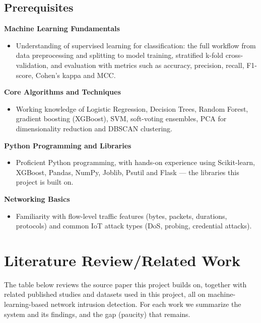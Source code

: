 \documentclass[12pt,a4paper]{article}
\begin{document}
\subsection{Prerequisites}
\textbf{Machine Learning Fundamentals}
\begin{itemize}
  \item Understanding of supervised learning for classification: the full workflow
        from data preprocessing and splitting to model training, stratified k-fold
        cross-validation, and evaluation with metrics such as accuracy, precision,
        recall, F1-score, Cohen's kappa and MCC.
\end{itemize}
\textbf{Core Algorithms and Techniques}
\begin{itemize}
  \item Working knowledge of Logistic Regression, Decision Trees, Random Forest,
        gradient boosting (XGBoost), SVM, soft-voting ensembles, PCA for
        dimensionality reduction and DBSCAN clustering.
\end{itemize}
\textbf{Python Programming and Libraries}
\begin{itemize}
  \item Proficient Python programming, with hands-on experience using Scikit-learn,
        XGBoost, Pandas, NumPy, Joblib, Psutil and Flask --- the libraries this
        project is built on.
\end{itemize}
\textbf{Networking Basics}
\begin{itemize}
  \item Familiarity with flow-level traffic features (bytes, packets, durations,
        protocols) and common IoT attack types (DoS, probing, credential attacks).
\end{itemize}

\clearpage
\section{Literature Review/Related Work}

The table below reviews the source paper this project builds on, together with
related published studies and datasets used in this project, all on
machine-learning-based network intrusion detection. For each work we summarize the
system and its findings, and the gap (paucity) that remains.
\end{document}
